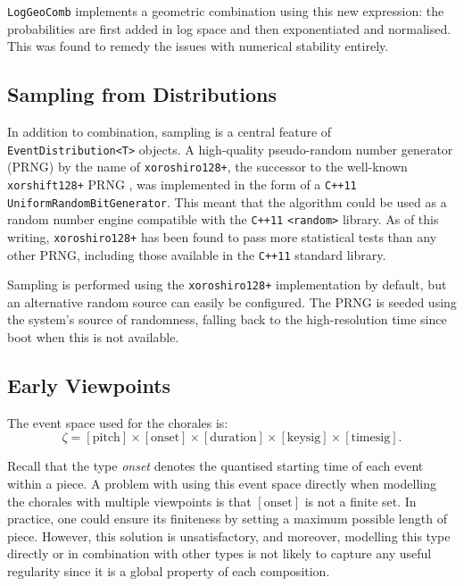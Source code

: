 \documentclass[12pt,a4paper,twoside,openright]{report}
\begin{document}
\texttt{LogGeoComb} implements a geometric combination using this new
expression: the probabilities are first added in log space and then
exponentiated and normalised. This was found to remedy the issues with numerical
stability entirely.

\subsection{Sampling from Distributions}

In addition to combination, sampling is a central feature of
\texttt{EventDistribution<T>} objects. A high-quality pseudo-random number
generator (PRNG) by the name of \texttt{xoroshiro128+}, the successor to the
well-known \texttt{xorshift128+} PRNG \cite{vigna2017further}, was implemented
in the form of a \texttt{C++11} \texttt{UniformRandomBitGenerator}. This meant
that the algorithm could be used as a random number engine compatible with the
\texttt{C++11} \texttt{<random>} library. As of this writing,
\texttt{xoroshiro128+} has been found to pass more statistical tests than any
other PRNG, including those available in the \texttt{C++11} standard library.

Sampling is performed using the \texttt{xoroshiro128+} implementation by
default, but an alternative random source can easily be configured. The PRNG is
seeded using the system's source of randomness, falling back to the
high-resolution time since boot when this is not available.

\subsection{Early Viewpoints}

The event space used for the chorales is:
$$ \zeta = [\mathrm{pitch}] \times [\mathrm{onset}] \times [\mathrm{duration}]
\times [\mathrm{keysig}] \times [\mathrm{timesig}]. $$

Recall that the type \emph{onset} denotes the quantised starting time of each
event within a piece.  A problem with using this event space directly when
modelling the chorales with multiple viewpoints is that $[\mathrm{onset}]$ is
not a finite set. In practice, one could ensure its finiteness by setting a
maximum possible length of piece. However, this solution is unsatisfactory, and
moreover, modelling this type directly or in combination with other types is not
likely to capture any useful regularity since it is a global property of each
composition.
\end{document}
